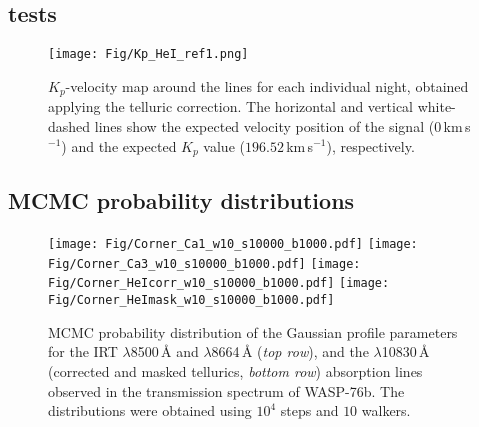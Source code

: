 \documentclass{aa}
\begin{document}
\begin{appendix}
\clearpage


\subsection{ tests}

\begin{figure*}[h]
\centering
\texttt{[image: Fig/Kp\_HeI\_ref1.png]}
\caption{$K_p$-velocity map around the  lines for each individual night, obtained applying the telluric correction. The horizontal and vertical white-dashed lines show the expected velocity position of the signal ($0$\,km\,s$^{-1}$) and the expected $K_p$ value ($196.52$\,km\,s$^{-1}$), respectively.}
\label{fig:Kp_HeI}
\end{figure*}

\clearpage

\subsection{MCMC probability distributions}



\begin{figure*}[h]
\centering
\texttt{[image: Fig/Corner\_Ca1\_w10\_s10000\_b1000.pdf]}
\texttt{[image: Fig/Corner\_Ca3\_w10\_s10000\_b1000.pdf]}
\texttt{[image: Fig/Corner\_HeIcorr\_w10\_s10000\_b1000.pdf]}
\texttt{[image: Fig/Corner\_HeImask\_w10\_s10000\_b1000.pdf]}

\caption{MCMC probability distribution of the Gaussian profile parameters for the  IRT $\lambda$8500\,{\AA} and $\lambda$8664\,{\AA} (\textit{top row}), and the  $\lambda$10830\,{\AA} (corrected and masked tellurics, \textit{bottom row}) absorption lines observed in the transmission spectrum of WASP-76b. The distributions were obtained using $10^4$ steps and $10$ walkers.}
\label{fig:corner}
\end{figure*}






\end{appendix}
\end{document}

